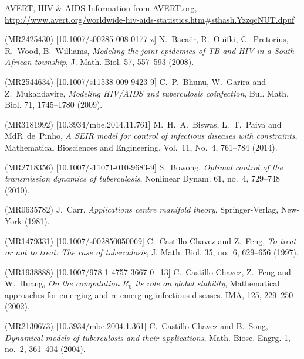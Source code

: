 \documentclass{my_aims}
\theoremstyle{definition}
\begin{document}
\begin{thebibliography}{99}

\newblock AVERT,
\newblock HIV \& AIDS Information from AVERT.org,
\newblock \url{http://www.avert.org/worldwide-hiv-aids-statistics.htm#sthash.YzzqcNUT.dpuf}

 (MR2425430) [10.1007/s00285-008-0177-z]
\newblock N.~Baca\"{e}r, R.~Ouifki, C.~Pretorius, R.~Wood, B.~Williams,
\newblock \emph{Modeling the joint epidemics of TB and HIV in a South African township},
\newblock J. Math. Biol. 57, 557--593 (2008).

 (MR2544634) [10.1007/s11538-009-9423-9]
\newblock C.~P.~Bhunu, W.~Garira and Z.~Mukandavire,
\newblock \emph{Modeling HIV/AIDS and tuberculosis coinfection},
\newblock Bul. Math. Biol. 71, 1745--1780 (2009).

 (MR3181992) [10.3934/mbe.2014.11.761]
\newblock M.~H.~A.~Biswas, L.~T.~Paiva and MdR~de~Pinho,
\newblock \emph{A SEIR model for control of infectious diseases with constraints},
\newblock Mathematical Biosciences and Engineering, Vol.~11, No.~4, 761--784 (2014).

 (MR2718356) [10.1007/s11071-010-9683-9]
\newblock S.~Bowong,
\newblock \emph{Optimal control of the transmission dynamics of tuberculosis},
\newblock Nonlinear Dynam. 61, no.~4, 729--748 (2010).

 (MR0635782)
\newblock J.~Carr,
\newblock \emph{Applications centre manifold theory},
\newblock Springer-Verlag, New-York (1981).

 (MR1479331) [10.1007/s002850050069]
\newblock C.~Castillo-Chavez and Z.~Feng,
\newblock \emph{To treat or not to treat: The case of tuberculosis},
\newblock J. Math. Biol. 35, no.~6, 629--656 (1997).

 (MR1938888) [10.1007/978-1-4757-3667-0_13]
\newblock C.~Castillo-Chavez, Z.~Feng and W.~Huang,
\newblock \emph{On the computation $R_0$ its role on global stability},
\newblock Mathematical approaches for emerging
and re-emerging infectious diseases. IMA, 125, 229--250 (2002).

 (MR2130673) [10.3934/mbe.2004.1.361]
\newblock C.~Castillo-Chavez and B.~Song,
\newblock \emph{Dynamical models of tuberculosis and their applications},
\newblock Math. Biosc. Engrg. 1, no.~2, 361--404 (2004).


\end{thebibliography}
\end{document}
